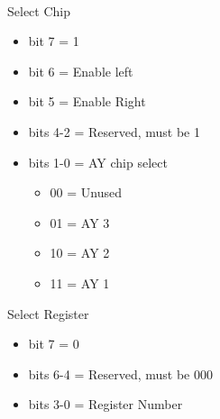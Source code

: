 \\
Select Chip
\begin{itemize}
\item[] bit 7 = 1
\item[] bit 6 = Enable left
\item[] bit 5 = Enable Right
\item[] bits 4-2 = Reserved, must be 1
\item[] bits 1-0 = AY chip select
  \begin{itemize}
  \item[] 00 = Unused
  \item[] 01 = AY 3
  \item[] 10 = AY 2
  \item[] 11 = AY 1
  \end{itemize}
\end{itemize}
Select Register
\begin{itemize}
\item[] bit 7 = 0
\item[] bits 6-4 = Reserved, must be 000
\item[] bits 3-0 = Register Number
\end{itemize}

